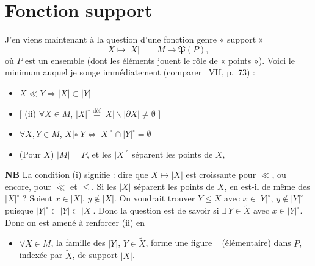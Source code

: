 \documentclass[11pt,a4paper]{article}
\begin{document}
\section{Fonction support}

J'en viens maintenant à la question d'une fonction genre « support »
\[
X \longmapsto |X| \qquad M \longrightarrow \mathfrak{P}(P),
\]
où $P$ est un ensemble (dont les éléments jouent le rôle de « points »). Voici
le minimum auquel je songe immédiatement (comparer ~VII,
p.~73) :


\begin{itemize}
  \item[(i)] $X \ll Y \Longrightarrow |X| \subset |Y|$ 
  \item[\struck{(ii)}] $\big[$ (ii) $\forall X \in M$, $|X|^\circ \overset{\text{déf}}{=} |X| \smallsetminus |\partial X| \neq \emptyset$ $\big]$ 
  \item[(iii)] $\forall X, Y \in M$, $X \mathbin{|{\circ}|} Y \Longleftrightarrow |X|^\circ \cap |Y|^\circ = \emptyset$ 
  \item[(iv)] (Pour  $X$) $|M| = P$, et les $|X|^\circ$ séparent les points de $X$, \ill{}
\end{itemize}

\textbf{NB} La condition (i) signifie : dire que $X \mapsto |X|$ est croissante
pour $\ll$, ou encore, pour $\mathring{\ll}$ et $\leq$. Si les $|X|$ séparent les
points de $X$, en est-il de même des $|X|^\circ$ ?
Soient $x \in |X|$, $y \notin |X|$. On voudrait trouver $Y \leq X$ avec
$x \in |Y|^\circ$,  $y \notin |Y|^\circ$ puisque
$|Y|^\circ \subset |Y| \subset |X|$. Donc la question est de \struck{\ill{}}
savoir si $\exists\, Y \in \tilde{X}$ avec $x \in |Y|^\circ$. Donc on est amené à
renforcer (ii) en

\begin{itemize}
  \item[(ii bis)] $\forall X \in M$, la famille des $|Y|$, $Y \in \tilde{X}$, forme
  une figure \  (élémentaire) dans $P$, indexée par
  $\tilde{X}$, de support $|X|$.
\end{itemize}
\end{document}
